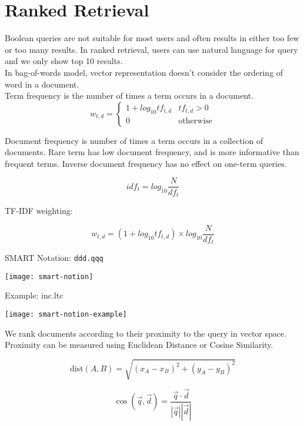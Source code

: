 \chapter{Ranked Retrieval}
\begin{multicols*}{2}

\noindent Boolean queries are not suitable for most users and often results in either too few or too many results. In ranked retrieval, users can use natural language for query and we only show top 10 results. \\

\noindent In bag-of-words model, vector representation doesn’t consider the ordering of word in a document.\\

\noindent Term frequency is the number of times a term occurs in a document. \\

$$w_{t,d} = 
\begin{cases}
    1 + log_{10} tf_{t,d} & tf_{t,d} > 0 \\
    0 & \text{otherwise}
\end{cases}
$$

\noindent Document frequency is number of times a term occurs in a collection of documents. Rare term has low document frequency, and is more informative than frequent terms. Inverse document frequency has no effect on one-term queries.

$$idf_t = log_{10} \frac{N}{df_t}$$

\noindent TF-IDF weighting: 

$$w_{t,d} = (1+ log_10 tf_{t,d})\times log_{10} \frac{N}{df_t}$$

\noindent SMART Notation: \verb|ddd.qqq|
\begin{center}
\texttt{[image: smart-notion]}
\end{center}

\noindent Example: inc.ltc
\begin{center}
\texttt{[image: smart-notion-example]}
\end{center}

\noindent We rank documents according to their proximity to the query in vector space. Proximity can be measured using Euclidean Distance or Cosine Similarity.

$$\text{dist}(A,B) = \sqrt{(x_A - x_B)^2 + (y_A - y_B)^2}$$

$$\cos (\vec{q},\vec{d}) = \frac{\vec{q} \cdot \vec{d}}{|\vec{q}||\vec{d}|}$$

\end{multicols*}
